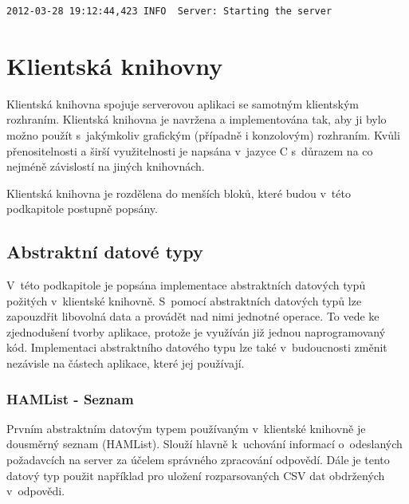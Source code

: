 \begin{verbatim}
2012-03-28 19:12:44,423 INFO  Server: Starting the server
\end{verbatim}

\section{Klientská knihovny}
\label{implementace_knihovna}

Klientská knihovna spojuje serverovou aplikaci se samotným klientským rozhraním.
Klientská knihovna je navržena a implementována
tak, aby ji bylo možno použít s~jakýmkoliv grafickým (případně i konzolovým) rozhraním. Kvůli přenositelnosti a
širší využitelnosti je napsána v~jazyce C s~důrazem na co nejméně závislostí na jiných knihovnách.

Klientská knihovna je rozdělena do menších bloků, které budou v~této podkapitole
postupně popsány.

\subsection{Abstraktní datové typy}

V~této podkapitole je popsána implementace abstraktních datových typů požitých v~klientské knihovně.
S~pomocí abstraktních datových typů lze zapouzdřit libovolná data a provádět nad nimi jednotné operace.
To vede ke zjednodušení tvorby aplikace, protože je využíván již jednou naprogramovaný kód. Implementaci
abstraktního datového typu lze také v~budoucnosti změnit nezávisle na částech aplikace, které jej používají.
\subsubsection{HAMList - Seznam}

Prvním abstraktním datovým typem používaným v~klientské knihovně
je dousměrný seznam (HAMList). Slouží hlavně k~uchování informací o~odeslaných požadavcích na server za účelem
správného zpracování odpovědí. Dále je tento datový typ použit například pro uložení rozparsovaných CSV dat obdržených
v~odpovědi.

